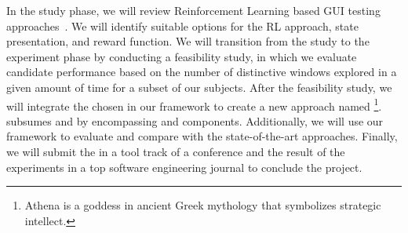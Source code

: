 \noindent
In the study phase, we will review Reinforcement Learning based  GUI testing approaches~\cite{Mariani:GUI:STVR:2014,Vuong:RLTest:A-Test:2018,Pan:QTesting:ISSTA:2020,Romdhana:ARES:TOSEM:2022}. 
We will identify suitable options for the RL approach, state presentation, and reward function.
We will transition from the study to the experiment phase by  conducting a feasibility study, in which we evaluate candidate \rlaganets performance based on the number of distinctive windows  explored in a given amount of time for a subset of our subjects. 
After the feasibility study, we will  integrate the chosen \rlaganet in our framework to create a new \testreuse approach named \rltool\footnote{Athena is a goddess in ancient Greek mythology that symbolizes strategic intellect.
}.
\rltool subsumes \visiontool and \llmtool by  encompassing \imagelabeler and \llmtranslator components.
Additionally, we will use our \tme framework to evaluate \rltool and compare with the state-of-the-art \testreuse approaches.
Finally, we will submit the \rltool in a tool track of a conference and the result of the \testreuse experiments in a top software  engineering journal to conclude the project. 
















